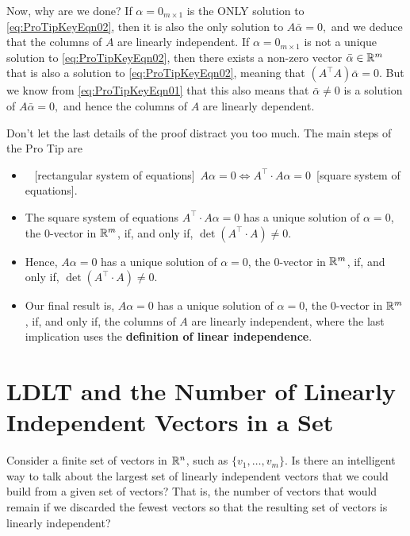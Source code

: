 Now, why are we done? If $\alpha = 0_{m \times 1}$ is the ONLY solution to \eqref{eq:ProTipKeyEqn02}, then it is also the only solution to  $A  \bar{\alpha}=0,$ and we deduce that the columns of $A$ are linearly independent. If $\alpha = 0_{m \times 1}$ is not a unique  solution to \eqref{eq:ProTipKeyEqn02},  then there exists a non-zero vector $ \bar{\alpha} \in \mathbb R^m$ that is also a solution to \eqref{eq:ProTipKeyEqn02}, meaning that $\left(A^\top A \right) \bar{\alpha} = 0.$
But we know from \eqref{eq:ProTipKeyEqn01} that this also means that  $ \bar{\alpha} \neq 0$ is a solution of $A  \bar{\alpha}=0,$
and hence the columns of $A$ are linearly dependent.\Qed

\vspace*{.5cm}

\begin{tcolorbox}[sharp corners, colback=green!30, colframe=green!80!blue,
title=\textbf{\Large Don't miss seeing the forest for the trees!}]

Don't let the last details of the proof distract you too much. The main steps of the Pro Tip are
\begin{itemize}
    \item~ [rectangular system of equations]~$A \alpha = 0 \iff  A^\top \cdot A \alpha = 0$~[square system of equations].
    \item The square system of equations $A^\top \cdot A \alpha = 0$ has a unique solution of $\alpha = 0$, the 0-vector in $\mathbb R^m$, if, and only if, $\det(A^\top \cdot A) \neq 0$.
    \item Hence, $A \alpha = 0 $  has a unique solution of $\alpha = 0$, the 0-vector in $\mathbb R^m$, if, and only if, $\det(A^\top \cdot A) \neq 0$.
    \item Our final result is, $A \alpha = 0 $  has a unique solution of $\alpha = 0$, the 0-vector in $\mathbb R^m$, if, and only if, the columns of $A$ are linearly independent, where the last implication uses the \textbf{definition of linear independence}.
\end{itemize}
\end{tcolorbox}


\section{LDLT and the Number of Linearly Independent Vectors in a Set}
\label{sec:NumberLinIndepVectors}

Consider a finite set of vectors in $\mathbb R^n$, such as $\{v_1, \ldots, v_m\}.$  
Is there an intelligent way to talk about the largest set of linearly independent vectors that we could build from a given set of vectors? That is, the number of vectors that would remain if we discarded the fewest vectors so that the resulting set of vectors is linearly independent?\\

